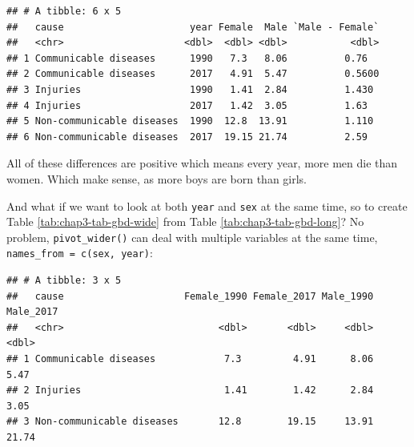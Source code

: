 \documentclass[
  12pt,
  krantz2]{krantz}
\makeatletter
\newenvironment{Shaded}{\begin{snugshade}}{\end{snugshade}}
\newcommand{\DataTypeTok}[1]{\textcolor[rgb]{0.13,0.29,0.53}{#1}}
\newcommand{\KeywordTok}[1]{\textcolor[rgb]{0.13,0.29,0.53}{\textbf{#1}}}
\newcommand{\NormalTok}[1]{#1}
\newcommand{\OperatorTok}[1]{\textcolor[rgb]{0.81,0.36,0.00}{\textbf{#1}}}
\newcommand{\StringTok}[1]{\textcolor[rgb]{0.31,0.60,0.02}{#1}}
\newenvironment{kframe}{%
\medskip{}
\setlength{\fboxsep}{.8em}
 \def\at@end@of@kframe{}%
 \ifinner\ifhmode%
  \def\at@end@of@kframe{\end{minipage}}%
  \begin{minipage}{\columnwidth}%
 \fi\fi%
 \def\FrameCommand##1{\hskip\@totalleftmargin \hskip-\fboxsep
 \colorbox{shadecolor}{##1}\hskip-\fboxsep
     \hskip-\linewidth \hskip-\@totalleftmargin \hskip\columnwidth}%
 \MakeFramed {\advance\hsize-\width
   \@totalleftmargin\z@ \linewidth\hsize
   \@setminipage}}%
 {\par\unskip\endMakeFramed%
 \at@end@of@kframe}
\renewenvironment{Shaded}{\begin{kframe}}{\end{kframe}}
\makeatother
\begin{document}
\begin{Shaded}
\end{Shaded}

\begin{verbatim}
## # A tibble: 6 x 5
##   cause                      year Female  Male `Male - Female`
##   <chr>                     <dbl>  <dbl> <dbl>           <dbl>
## 1 Communicable diseases      1990   7.3   8.06          0.76  
## 2 Communicable diseases      2017   4.91  5.47          0.5600
## 3 Injuries                   1990   1.41  2.84          1.430 
## 4 Injuries                   2017   1.42  3.05          1.63  
## 5 Non-communicable diseases  1990  12.8  13.91          1.110 
## 6 Non-communicable diseases  2017  19.15 21.74          2.59
\end{verbatim}

All of these differences are positive which means every year, more men die than women.
Which make sense, as more boys are born than girls.

And what if we want to look at both \texttt{year} and \texttt{sex} at the same time, so to create Table \ref{tab:chap3-tab-gbd-wide} from Table \ref{tab:chap3-tab-gbd-long}?
No problem, \texttt{pivot\_wider()} can deal with multiple variables at the same time, \texttt{names\_from\ =\ c(sex,\ year)}:

\begin{Shaded}
\end{Shaded}

\begin{verbatim}
## # A tibble: 3 x 5
##   cause                     Female_1990 Female_2017 Male_1990 Male_2017
##   <chr>                           <dbl>       <dbl>     <dbl>     <dbl>
## 1 Communicable diseases            7.3         4.91      8.06      5.47
## 2 Injuries                         1.41        1.42      2.84      3.05
## 3 Non-communicable diseases       12.8        19.15     13.91     21.74
\end{verbatim}
\end{document}
